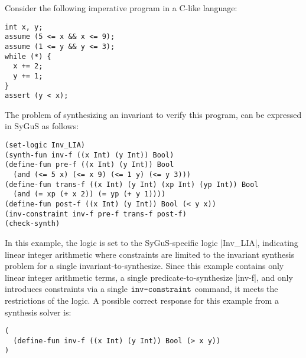 \documentclass[english,a4paper,10pt]{article}
\begin{document}
\begin{example}
Consider the following imperative program in a C-like language:
\begin{lstlisting}[language=C-Like]
int x, y;
assume (5 <= x && x <= 9);
assume (1 <= y && y <= 3);
while (*) {
  x += 2;
  y += 1;
}
assert (y < x);
\end{lstlisting}
The problem of synthesizing an invariant to verify this program,
can be expressed in SyGuS as follows:
\begin{lstlisting}[language=SyGuS]
(set-logic Inv_LIA)
(synth-fun inv-f ((x Int) (y Int)) Bool)
(define-fun pre-f ((x Int) (y Int)) Bool 
  (and (<= 5 x) (<= x 9) (<= 1 y) (<= y 3)))
(define-fun trans-f ((x Int) (y Int) (xp Int) (yp Int)) Bool 
  (and (= xp (+ x 2)) (= yp (+ y 1))))
(define-fun post-f ((x Int) (y Int)) Bool (< y x))
(inv-constraint inv-f pre-f trans-f post-f)
(check-synth)
\end{lstlisting}
In this example, the logic is set to the SyGuS-specific logic
\code|Inv_LIA|, indicating linear integer arithmetic
where constraints are limited to the invariant synthesis problem for
a single invariant-to-synthesize.
Since this example contains only linear integer arithmetic terms,
a single predicate-to-synthesize \code|inv-f|,
and only introduces constraints via a single $\texttt{inv-constraint}$ command,
it meets the restrictions of the logic.
A possible correct response for this example from a synthesis solver is:
\begin{lstlisting}[language=SyGuS]
(
  (define-fun inv-f ((x Int) (y Int)) Bool (> x y))
)
\end{lstlisting}
\end{example}
\end{document}
